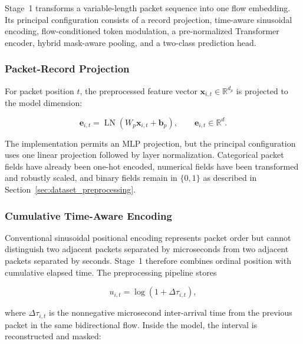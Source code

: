 Stage~1 transforms a variable-length packet sequence into one flow embedding.
Its principal configuration consists of a record projection, time-aware
sinusoidal encoding, flow-conditioned token modulation, a pre-normalized
Transformer encoder, hybrid mask-aware pooling, and a two-class prediction
head.

\subsubsection{Packet-Record Projection}
\label{subsubsec:packet_projection}

For packet position $t$, the preprocessed feature vector
$\mathbf{x}_{i,t}\in\mathbb{R}^{d_p}$ is projected to the model dimension:

\begin{equation}
    \mathbf{e}_{i,t}
    =\operatorname{LN}
    \left(W_p\mathbf{x}_{i,t}+\mathbf{b}_p\right),
    \qquad
    \mathbf{e}_{i,t}\in\mathbb{R}^{d}.
    \label{eq:record_projection}
\end{equation}

The implementation permits an MLP projection, but the principal configuration
uses one linear projection followed by layer normalization. Categorical packet
fields have already been one-hot encoded, numerical fields have been transformed
and robustly scaled, and binary fields remain in $\{0,1\}$ as described in
Section~\ref{sec:dataset_preprocessing}.

\subsubsection{Cumulative Time-Aware Encoding}
\label{subsubsec:time_aware_encoding}

Conventional sinusoidal positional encoding represents packet order but cannot
distinguish two adjacent packets separated by microseconds from two adjacent
packets separated by seconds. Stage~1 therefore combines ordinal position with
cumulative elapsed time. The preprocessing pipeline stores

\begin{equation}
    u_{i,t}=\log\left(1+\Delta\tau_{i,t}\right),
    \label{eq:stored_log_iat}
\end{equation}

where $\Delta\tau_{i,t}$ is the nonnegative microsecond inter-arrival time from
the previous packet in the same bidirectional flow. Inside the model, the
interval is reconstructed and masked:

